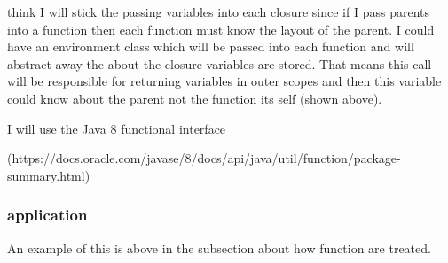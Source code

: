 \documentclass[12pt,a4paper,twoside]{article}
\def\comment#1\done{{\color{blue}#1}}
\begin{document}
\comment I think I will stick the passing variables into each closure since if I pass parents into a
function then each function must know the layout of the parent. I could have an environment class which 
will be passed into each function and will abstract away the about the closure variables are stored. That 
means this call will be responsible for returning variables in outer scopes and then this variable could 
know about the parent not the function its self (shown above). \done





I will use the Java 8 functional interface 

(https://docs.oracle.com/javase/8/docs/api/java/util/function/package-summary.html)


\subsubsection{application}

An example of this is above in the subsection about how function are treated.
\end{document}
